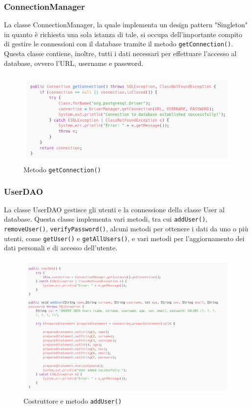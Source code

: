 \documentclass{article}
\begin{document}
\subsubsection{ConnectionManager}
La classe ConnectionManager, la quale implementa un design pattern "Singleton" in quanto è richiesta una sola istanza di tale, si occupa dell'importante compito di gestire le connessioni con il database tramite il metodo \texttt{getConnection()}. Questa classe contiene, inoltre, tutti i dati necessari per effettuare l'accesso al database, ovvero l'URL, username e password.

\begin{figure}[!h]
    \includegraphics[width=1.0\linewidth]{imgs/snippets/Code_GetConnection.png}
    \caption{Metodo \texttt{getConnection()}}
    \label{code_getConnection}
\end{figure}

\subsubsection{UserDAO}
La classe UserDAO gestisce gli utenti e la connessione della classe User al database. Questa classe implementa vari metodi, tra cui \texttt{addUser()}, \texttt{removeUser()}, \texttt{verifyPassword()}, alcuni metodi per ottenere i dati da uno o più utenti, come \texttt{getUser()} e \texttt{getAllUsers()}, e vari metodi per l'aggiornamento dei dati personali e di accesso dell'utente.

\begin{figure}[!h]
    \includegraphics[width=1.0\linewidth]{imgs/snippets/Code_ClassUserDAO.png}
    \caption{Costruttore e metodo \texttt{addUser()}}
    \label{code_classUserDAO}
\end{figure}
\end{document}
